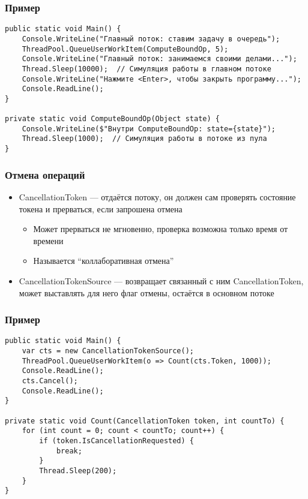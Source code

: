 \documentclass{../../slides-style}
\begin{document}
    \begin{frame}[fragile]
        \frametitle{Пример}
        \begin{verbatim}
public static void Main() {
    Console.WriteLine("Главный поток: ставим задачу в очередь");
    ThreadPool.QueueUserWorkItem(ComputeBoundOp, 5);
    Console.WriteLine("Главный поток: занимаемся своими делами...");
    Thread.Sleep(10000);  // Симуляция работы в главном потоке
    Console.WriteLine("Нажмите <Enter>, чтобы закрыть программу...");
    Console.ReadLine();
}

private static void ComputeBoundOp(Object state) {
    Console.WriteLine($"Внутри ComputeBoundOp: state={state}");
    Thread.Sleep(1000);  // Симуляция работы в потоке из пула
}
        \end{verbatim}
    \end{frame}

    \begin{frame}
        \frametitle{Отмена операций}
        \begin{itemize}
            \item CancellationToken --- отдаётся потоку, он должен сам проверять состояние токена и прерваться, если запрошена отмена
            \begin{itemize}
                \item Может прерваться не мгновенно, проверка возможна только время от времени
                \item Называется ``коллаборативная отмена''
            \end{itemize}
            \item CancellationTokenSource --- возвращает связанный с ним CancellationToken, может выставлять для него флаг отмены, остаётся в основном потоке
        \end{itemize}
    \end{frame}

    \begin{frame}[fragile]
        \frametitle{Пример}
        \begin{small}
            \begin{verbatim}
public static void Main() {
    var cts = new CancellationTokenSource();
    ThreadPool.QueueUserWorkItem(o => Count(cts.Token, 1000));
    Console.ReadLine();
    cts.Cancel();
    Console.ReadLine();
}

private static void Count(CancellationToken token, int countTo) {
    for (int count = 0; count < countTo; count++) {
        if (token.IsCancellationRequested) {
            break;
        }
        Thread.Sleep(200); 
    }
}
            \end{verbatim}
        \end{small}
    \end{frame}
\end{document}
